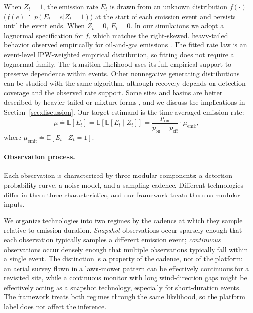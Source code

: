 \documentclass[numsec,webpdf,modern,mediumone]{oup-authoring-template}
\newcommand{\new}[1]{#1}
\newcommand{\edit}[1]{#1}
\begin{document}
When $Z_t = 1$, the emission rate $E_t$ is drawn from an unknown distribution $f(\cdot)$ ($f(e)\doteq p(E_t=e|Z_t=1)$) at the start of each emission event and persists until the event ends. When $Z_t = 0$, $E_t = 0$. \edit{In our simulations we adopt a lognormal specification for $f$, which matches the right-skewed, heavy-tailed behavior observed empirically for oil-and-gas emissions \citep{Brandt2016, ZavalaAraiza2015}. The fitted rate law is an event-level IPW-weighted empirical distribution, so fitting does not require a lognormal family. The transition likelihood uses its full empirical support to preserve dependence within events. Other nonnegative generating distributions can be studied with the same algorithm, although recovery depends on detection coverage and the observed rate support. Some sites and basins are better described by heavier-tailed or mixture forms \citep{Sherwin2024Nature}, and we discuss the implications in Section~\ref{sec:discussion}.} Our target estimand is the time-averaged emission rate:
\begin{equation}
    \mu
    \doteq \mathbb{E}[E_t]
    = \mathbb{E}[\mathbb{E}[E_t\mid Z_t]]
    = \frac{p_\text{on}}{p_\text{on}+p_\text{off}}\cdot \mu_\text{emit},
    \label{eq:target}
\end{equation}
where $\mu_\text{emit}\doteq\mathbb{E}[E_t\mid Z_t=1]$.

\paragraph{Observation process.}
Each observation is characterized by three modular components: a detection probability curve, a noise model, and a sampling cadence. Different technologies differ in these three characteristics, and our framework treats these as modular inputs.

\new{We organize technologies into two regimes by the cadence at which they sample relative to emission duration. \emph{Snapshot} observations occur sparsely enough that each observation typically samples a different emission event; \emph{continuous} observations occur densely enough that multiple observations typically fall within a single event. The distinction is a property of the cadence, not of the platform: an aerial survey flown in a lawn-mower pattern can be effectively continuous for a revisited site, while a continuous monitor with long wind-direction gaps might be effectively acting as a snapshot technology, especially for short-duration events. The framework treats both regimes through the same likelihood, so the platform label does not affect the inference.}
\end{document}
